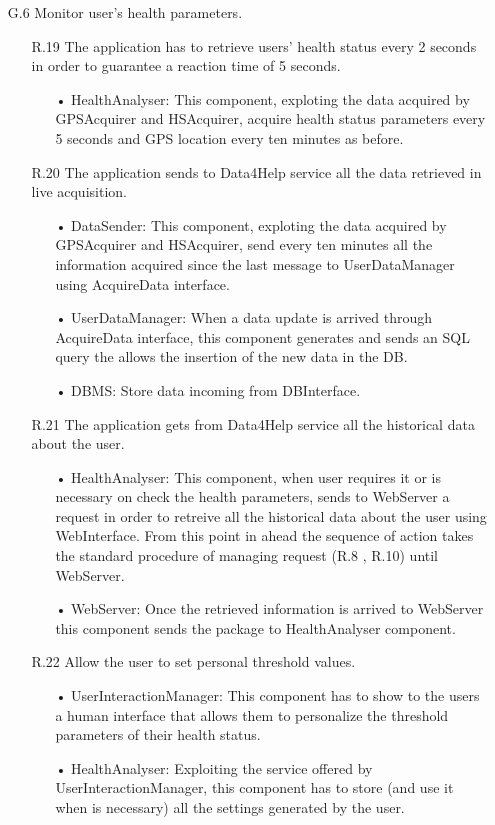 \begin{enumerate}
\item [G.6] Monitor user's health parameters.
	\begin{enumerate}
	\item [R.19] The application has to retrieve users' health status every 2 seconds in order to guarantee a reaction time of 5 seconds.
		\begin{enumerate}
		\item[•] HealthAnalyser: This component, exploting the data acquired by GPSAcquirer and HSAcquirer, acquire health status parameters every 5 seconds and GPS location every ten minutes as before.
		\end{enumerate}	
	\item [R.20] The application sends to Data4Help service all the data retrieved in live acquisition.
		\begin{enumerate}
		\item[•] DataSender: This component, exploting the data acquired by GPSAcquirer and HSAcquirer, send every ten minutes all the information acquired since the last message to UserDataManager using AcquireData interface.
		\item[•] UserDataManager: When a data update is arrived through AcquireData interface, this component generates and sends an SQL query the allows the insertion of the new data in the DB.
		\item[•] DBMS: Store data incoming from DBInterface.
		\end{enumerate}	
	\item [R.21] The application gets from Data4Help service all the historical data about the user.
		\begin{enumerate}
		\item[•] HealthAnalyser: This component, when user requires it or is necessary on check the health parameters, sends to WebServer a request in order to retreive all the historical data about the user using WebInterface. From this point in ahead the sequence of action takes the standard procedure of managing request (R.8 , R.10) until WebServer.
		\item[•] WebServer: Once the retrieved information is arrived to WebServer this component sends the package to HealthAnalyser component.
		\end{enumerate}
	\item [R.22] Allow the user to set personal threshold values.
		\begin{enumerate}
		\item[•] UserInteractionManager: This component has to show to the users a human interface that allows them to personalize the threshold parameters of their health status.
		\item[•] HealthAnalyser: Exploiting the service offered by UserInteractionManager, this component has to store (and use it when is necessary) all the settings generated by the user.
		\end{enumerate}
	\end{enumerate}


\end{enumerate}
